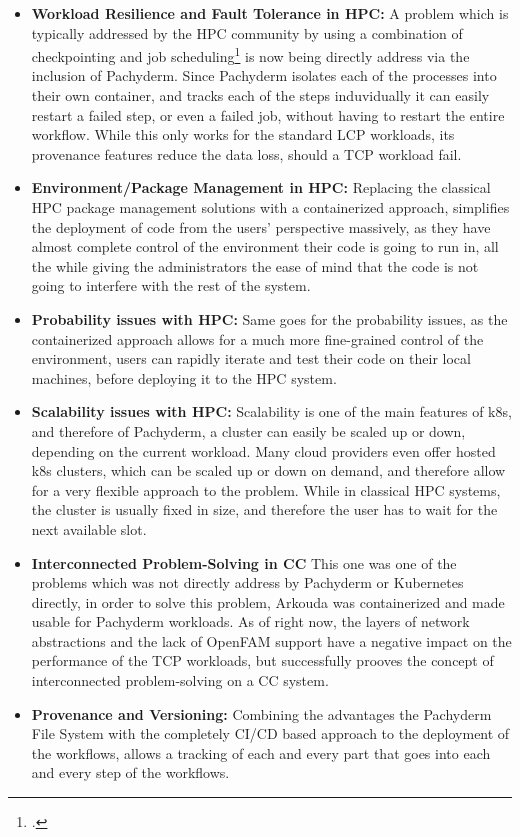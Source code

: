 \begin{itemize}
    \item \textbf{Workload Resilience and Fault Tolerance in HPC:}
    A problem which is typically addressed by the \ac{HPC} community by using a combination of checkpointing and job scheduling\footcite{jinOptimizingHPCFaultTolerant2010}
    is now being directly address via the inclusion of Pachyderm.
    Since Pachyderm isolates each of the processes into their own container, and tracks each of the steps induvidually
    it can easily restart a failed step, or even a failed job, without having to restart the entire workflow.
    While this only works for the standard \ac{LCP} workloads, its provenance features reduce the data loss, should a \ac{TCP} workload fail.
    \item \textbf{Environment/Package Management in HPC:} 
    Replacing the classical \ac{HPC} package management solutions with a containerized approach,
    simplifies the deployment of code from the users' perspective massively, as they have almost complete control of the environment their code 
    is going to run in, all the while giving the administrators the ease of mind that the code is not going to interfere with the rest of the system.
    \item \textbf{Probability issues with HPC:}
    Same goes for the probability issues, as the containerized approach allows for a much more fine-grained control of the environment,
    users can rapidly iterate and test their code on their local machines, before deploying it to the \ac{HPC} system.
    \item \textbf{Scalability issues with HPC:}
    Scalability is one of the main features of \ac{k8s}, and therefore of Pachyderm, a cluster can easily be scaled up or down, depending on the current workload.
    Many cloud providers even offer hosted \ac{k8s} clusters, which can be scaled up or down on demand, and therefore allow for a very flexible approach to the problem.
    While in classical \ac{HPC} systems, the cluster is usually fixed in size, and therefore the user has to wait for the next available slot.
    \item \textbf{Interconnected Problem-Solving in \ac{CC}}
    This one was one of the problems which was not directly address by Pachyderm or Kubernetes directly,
    in order to solve this problem, Arkouda was containerized and made usable for Pachyderm workloads.
    As of right now, the layers of network abstractions and the lack of OpenFAM support have a negative impact on the performance of the \ac{TCP} workloads,
    but successfully prooves the concept of interconnected problem-solving on a \ac{CC} system.
    \item \textbf{Provenance and Versioning:}
    Combining the advantages the Pachyderm File System with the completely \ac{CI/CD} based approach to the deployment of the workflows,
    allows a tracking of each and every part that goes into each and every step of the workflows.
\end{itemize}


